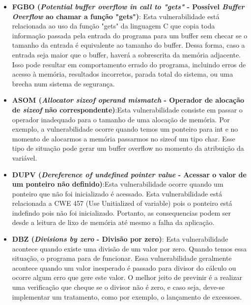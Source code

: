 \begin{itemize}
%

\item \textbf{FGBO (\emph{Potential buffer overflow in call to "gets" } - Possível \emph{Buffer Overflow} ao chamar a função "gets")}: Esta vulnerabilidade está relacionada ao uso da função "gets" da linguagem C que copia toda informação passada pela entrada do programa para um buffer sem checar se o tamanho da entrada é equivalente ao tamanho do buffer. Dessa forma, caso a entrada seja maior que o buffer, haverá a sobrescrita da memória adjacente. Isso pode resultar em comportamento errado do programa, incluindo erros de acesso à memória, resultados incorretos, parada total do sistema, ou uma brecha num sistema de segurança.

%

\item \textbf{ASOM (\emph{Allocator sizeof operand mismatch } - Operador de alocação de \emph{sizeof} não correspondente)}:Esta vulnerabilidade consiste em passar o operador inadequado para o tamanho de uma alocação de memória. Por exemplo, a vulnerabilidade ocorre quando temos um ponteiro para int e no momento de alocarmos a memória passarmos no sizeof um tipo char. Esse tipo de situação pode gerar um buffer overflow no momento da atribuição da variável.

%

\item \textbf{DUPV (\emph{Dereference of undefined pointer value } - Acessar o valor de um ponteiro não definido)}:Esta vulnerabilidade ocorre quando um ponteiro que não foi inicializado é acessado. Esta vulnerabilidade está relacionada a CWE 457 (Use Unitialized of variable) pois o ponteiro está indefindo pois não foi inicializado. Portanto, as consequencias podem ser desde a leitura de lixo de memória até mesmo a falha da aplicação.

%

\item \textbf{DBZ (\emph{Divisions by zero } - Divisão por zero)}: Esta vulnerabilidade acontece quando existe uma divisão de um valor por zero. Quando temos essa situação, o programa para de funcionar. Essa vulnerabilidade geralmente acontece quando um valor inesperado é passado para divisor do cálculo ou ocorre algum erro que gere este valor. O melhor jeito de previnir é a realizar uma verificação que cheque se o divisor não é zero, e caso seja, deve-se implementar um tratamento, como por exemplo, o lançamento de excessoes.

%


\end{itemize}
